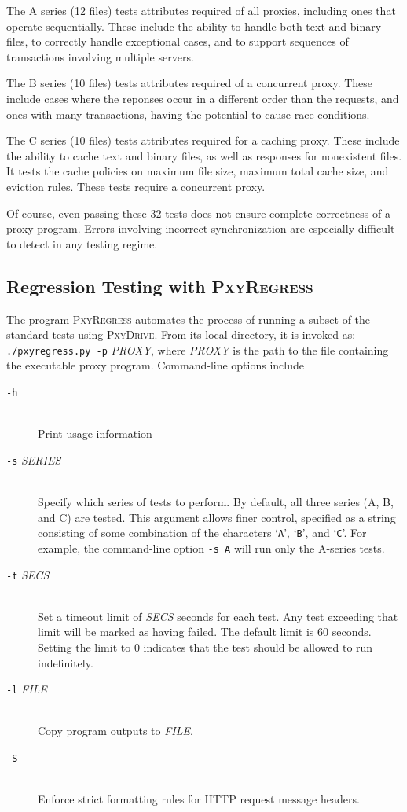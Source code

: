 \documentclass[11pt]{article}
\newcommand{\pxydrive}{\textsc{PxyDrive}}
\newcommand{\pxyregress}{\textsc{PxyRegress}}
\begin{document}
The A series (12 files)
tests attributes
required of all proxies, including ones that operate sequentially.  These include the
ability to handle both text and binary files, to correctly handle
exceptional cases, and to support sequences of transactions involving
multiple servers.

The B series (10 files)
tests attributes
required of
a concurrent proxy.  These include cases where the reponses occur in a
different order than the requests, and ones with many transactions,
having the potential to cause race conditions.

The C series (10 files)
tests attributes
required for a caching proxy.  These include the ability to cache text and binary
files, as well as responses for nonexistent files.  It tests the
cache policies on maximum file size, maximum total cache size, and
eviction rules.  These tests require a concurrent
proxy.

Of course, even passing these 32 tests does not ensure complete correctness
of a proxy program.  Errors involving incorrect synchronization are
especially difficult to detect in any testing regime.

\subsection*{Regression Testing with \pxyregress}

The program \pxyregress{} automates the process of running a subset of
the standard tests using \pxydrive{}.
From its local directory, it is invoked as:
\texttt{./pxyregress.py -p} {\it PROXY}, where {\it PROXY} is the path
to the file
containing the executable proxy program.  Command-line options include 
\begin{description}
\item[\texttt{-h}]  $\;$ \\
Print usage information
\item[\texttt{-s} {\it SERIES}] $\;$ \\
Specify which series of tests to
  perform.  By default, all three series (A, B, and C) are tested.  This argument
  allows finer control, specified as a string consisting of some
  combination of the characters
  `\texttt{A}',   `\texttt{B}', and   `\texttt{C}'.  For example, the
  command-line option \texttt{-s A} will run only the A-series tests.
\item[\texttt{-t} {\it SECS}] $\;$ \\
  Set a timeout limit of {\it SECS} seconds for each test.  Any test exceeding
  that limit will be marked as having failed.  The default limit is
  60 seconds.  Setting the limit to 0 indicates that the test should
  be allowed to run indefinitely.
\item[\texttt{-l} {\it FILE}]  $\;$ \\
Copy program outputs to {\it FILE}\@.
\item[\texttt{-S}]  $\;$ \\
Enforce strict formatting rules for HTTP request message headers. 
\end{description}
\end{document}
